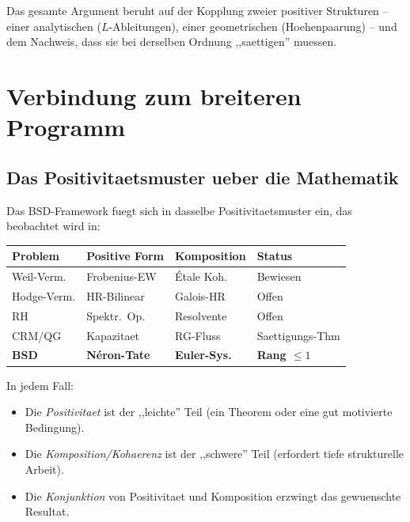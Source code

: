 \documentclass[aps,prd,twocolumn,superscriptaddress,nofootinbib]{revtex4-2}
\theoremstyle{definition}
\theoremstyle{remark}
\begin{document}
Das gesamte Argument beruht auf der Kopplung zweier positiver Strukturen -- einer analytischen ($L$-Ableitungen), einer geometrischen (Hoehenpaarung) -- und dem Nachweis, dass sie bei derselben Ordnung ,,saettigen'' muessen.


\section{Verbindung zum breiteren Programm}
\label{sec:connection}

\subsection{Das Positivitaetsmuster ueber die Mathematik}

Das BSD-Framework fuegt sich in dasselbe Positivitaetsmuster ein, das beobachtet wird in:

\begin{center}
\begin{tabular}{llll}
\toprule
Problem & Positive Form & Komposition & Status \\
\midrule
Weil-Verm. & Frobenius-EW & \'Etale Koh. & Bewiesen \\
Hodge-Verm. & HR-Bilinear & Galois-HR & Offen \\
RH \cite{GeigerRH2026c} & Spektr.\ Op. & Resolvente & Offen \\
CRM/QG \cite{FST-Unified2026} & Kapazitaet & RG-Fluss & Saettigungs-Thm \\
\textbf{BSD} & \textbf{N\'eron-Tate} & \textbf{Euler-Sys.} & \textbf{Rang $\leq 1$} \\
\bottomrule
\end{tabular}
\end{center}

In jedem Fall:
\begin{itemize}
\item Die \textit{Positivitaet} ist der ,,leichte'' Teil (ein Theorem oder eine gut motivierte Bedingung).
\item Die \textit{Komposition/Kohaerenz} ist der ,,schwere'' Teil (erfordert tiefe strukturelle Arbeit).
\item Die \textit{Konjunktion} von Positivitaet und Komposition erzwingt das gewuenschte Resultat.
\end{itemize}
\end{document}
